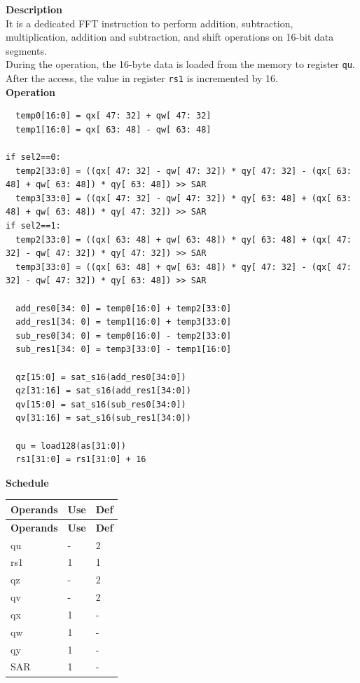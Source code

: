 \textbf{Description}\\
It is a dedicated FFT instruction to perform addition, subtraction, multiplication, addition and subtraction, and shift operations on 16-bit data segments.\\
During the operation, the 16-byte data is loaded from the memory to register \lstinline{qu}. After the access, the value in register \lstinline{rs1} is incremented by 16.\\
\textbf{Operation}

\begin{lstlisting}
  temp0[16:0] = qx[ 47: 32] + qw[ 47: 32]
  temp1[16:0] = qx[ 63: 48] - qw[ 63: 48]

if sel2==0:
  temp2[33:0] = ((qx[ 47: 32] - qw[ 47: 32]) * qy[ 47: 32] - (qx[ 63: 48] + qw[ 63: 48]) * qy[ 63: 48]) >> SAR
  temp3[33:0] = ((qx[ 47: 32] - qw[ 47: 32]) * qy[ 63: 48] + (qx[ 63: 48] + qw[ 63: 48]) * qy[ 47: 32]) >> SAR
if sel2==1:
  temp2[33:0] = ((qx[ 63: 48] + qw[ 63: 48]) * qy[ 63: 48] + (qx[ 47: 32] - qw[ 47: 32]) * qy[ 47: 32]) >> SAR
  temp3[33:0] = ((qx[ 63: 48] + qw[ 63: 48]) * qy[ 47: 32] - (qx[ 47: 32] - qw[ 47: 32]) * qy[ 63: 48]) >> SAR

  add_res0[34: 0] = temp0[16:0] + temp2[33:0]
  add_res1[34: 0] = temp1[16:0] + temp3[33:0]
  sub_res0[34: 0] = temp0[16:0] - temp2[33:0]
  sub_res1[34: 0] = temp3[33:0] - temp1[16:0]

  qz[15:0] = sat_s16(add_res0[34:0])
  qz[31:16] = sat_s16(add_res1[34:0])
  qv[15:0] = sat_s16(sub_res0[34:0])
  qv[31:16] = sat_s16(sub_res1[34:0])

  qu = load128(as[31:0])
  rs1[31:0] = rs1[31:0] + 16
\end{lstlisting}

\textbf{Schedule}\\
\begin{longtable}[c]{|l|l|l|}
    \hline
    \rowcolor{lightgray}
    \textbf{Operands} & \textbf{Use} & \textbf{Def} \\\hline
    \endfirsthead
    \hline
    \rowcolor{lightgray}
     \textbf{Operands} & \textbf{Use} & \textbf{Def} \\\hline
    \endhead
    \hline
    \endfoot

  qu & - & 2 \\\hline
  rs1 & 1 & 1 \\\hline
  qz & - & 2 \\\hline
  qv & - & 2 \\\hline
  qx & 1 & - \\\hline
  qw & 1 & - \\\hline
  qy & 1 & - \\\hline
  SAR & 1 & -

\end{longtable}

